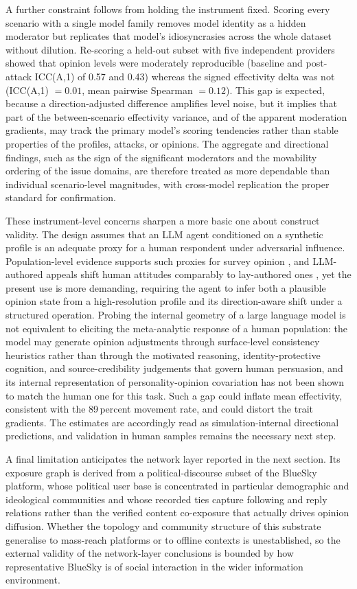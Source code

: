 \documentclass[11pt,a4paper]{article}
\begin{document}
A further constraint follows from holding the instrument fixed. Scoring every scenario with a
single model family removes model identity as a hidden moderator but replicates that model's
idiosyncrasies across the whole dataset without dilution. Re-scoring a held-out subset with five
independent providers showed that opinion levels were moderately reproducible (baseline and
post-attack ICC(A,1) of 0.57 and 0.43) whereas the signed effectivity delta was not
(ICC(A,1) $= 0.01$, mean pairwise Spearman $= 0.12$). This gap is expected, because a
direction-adjusted difference amplifies level noise, but it implies that part of the
between-scenario effectivity variance, and of the apparent moderation gradients, may track the
primary model's scoring tendencies rather than stable properties of the profiles, attacks, or
opinions. The aggregate and directional findings, such as the sign of the significant
moderators and the movability ordering of the issue domains, are therefore treated as more
dependable than individual scenario-level magnitudes, with cross-model replication the proper
standard for confirmation.

These instrument-level concerns sharpen a more basic one about construct validity. The design
assumes that an LLM agent conditioned on a synthetic profile is an adequate proxy for a human
respondent under adversarial influence. Population-level evidence supports such proxies for
survey opinion \citep{argyle2023out}, and LLM-authored appeals shift human attitudes comparably
to lay-authored ones \citep{bai2025llm}, yet the present use is more demanding, requiring the
agent to infer both a plausible opinion state from a high-resolution profile and its
direction-aware shift under a structured operation. Probing the internal geometry of a large
language model is not equivalent to eliciting the meta-analytic response of a human population:
the model may generate opinion adjustments through surface-level consistency heuristics rather
than through the motivated reasoning, identity-protective cognition, and source-credibility
judgements that govern human persuasion, and its internal representation of
personality-opinion covariation has not been shown to match the human one for this task. Such
a gap could inflate mean effectivity, consistent with the 89\,percent movement rate, and could
distort the trait gradients. The estimates are accordingly read as simulation-internal
directional predictions, and validation in human samples remains the necessary next step.

A final limitation anticipates the network layer reported in the next section. Its exposure
graph is derived from a political-discourse subset of the BlueSky platform, whose political user
base is concentrated in particular demographic and ideological communities and whose recorded
ties capture following and reply relations rather than the verified content co-exposure that
actually drives opinion diffusion. Whether the topology and community structure of this
substrate generalise to mass-reach platforms or to offline contexts is unestablished, so the
external validity of the network-layer conclusions is bounded by how representative BlueSky is
of social interaction in the wider information environment.
\end{document}

